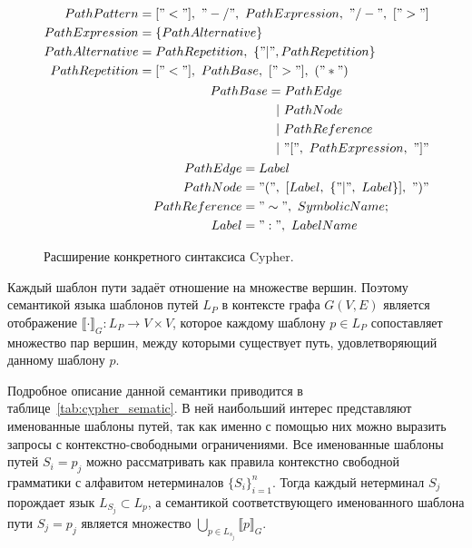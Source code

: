\begin{figure}[]
\begin{align*}
\begin{split}
PathPattern     &= ["<"],~"-/",~PathExpression,~"/-",~[">"]\\
PathExpression  &= \{PathAlternative\}\\
PathAlternative &= PathRepetition,~\{"|", PathRepetition\}\\
PathRepetition  &= ["<"],~PathBase,~[">"],~("*")
\end{split}\\
\begin{split}
PathBase &= PathEdge \\
         &~~|~PathNode \\
         &~~|~PathReference \\
         &~~|~"[",~PathExpression,~"]"
\end{split}\\
\begin{split}
PathEdge      &= Label \\
PathNode      &= "(",~[Label,~\{"|",~Label\}],~")" \\
PathReference &= "\sim",~SymbolicName; \\
Label         &= ":",~LabelName
\end{split}
\end{align*}
\caption{Расширение конкретного синтаксиса Cypher.}
\label{fig:cypher_syntax}
\end{figure}

Каждый шаблон пути задаёт отношение на множестве вершин. Поэтому семантикой языка шаблонов путей $L_{P}$ в контексте графа $G(V, E)$ является отображение $\llbracket \cdot \rrbracket_{G}: L_P \rightarrow V \times V$, которое каждому шаблону $p\in L_P$ сопоставляет множество пар вершин, между которыми существует путь, удовлетворяющий данному шаблону $p$. 

Подробное описание данной семантики приводится в таблице~\ref{tab:cypher_sematic}.  В ней наибольший интерес представляют именованные шаблоны путей, так как именно с помощью них можно выразить запросы с контекстно-свободными ограничениями. Все именованные шаблоны путей $S_i = p_j$ можно рассматривать как правила контекстно свободной грамматики с алфавитом нетерминалов $\{S_i\}_{i=1}^n$. Тогда каждый нетерминал $S_j$ порождает язык $L_{S_j} \subset L_p$, а семантикой соответствующего именованного шаблона пути $S_j=p_j$ является множество $\bigcup\limits_{p \in L_{s_j}} \llbracket p \rrbracket_{G}$.

